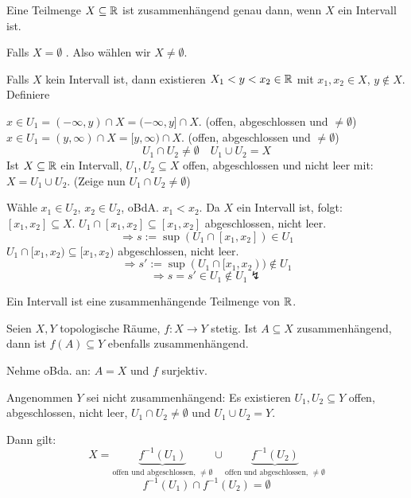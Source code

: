 \documentclass[main.tex]{subfiles}
\begin{document}
\begin{Theorem}
  Eine Teilmenge $X \subseteq \mathbb{R}$ ist zusammenhängend genau dann, wenn $X$ ein Intervall ist.
\end{Theorem}

\begin{Beweis}
  Falls $X = \emptyset$ \checkmark. Also wählen wir $X \neq \emptyset$.

  Falls $X$ kein Intervall ist, dann existieren $X_1 < y < x_2 \in \mathbb{R}$ mit $x_1,x_2 \in X$, $y \notin X$. Definiere

  $x \in U_1 = (-\infty, y) \cap X = (-\infty,y] \cap X$. (offen, abgeschlossen und $\neq \emptyset$)
  $x \in U_1 = (y,\infty) \cap X = [y,\infty) \cap X$. (offen, abgeschlossen und $\neq \emptyset$)
  $$U_1 \cap U_2 \neq \emptyset \quad U_1 \cup U_2 = X$$
  Ist $X \subseteq \mathbb{R}$ ein Intervall, $U_1 , U_2 \subseteq X$ offen, abgeschlossen und nicht leer mit: $X = U_1 \cup U_2$. (Zeige nun $U_1 \cap U_2 \neq \emptyset$)

  Wähle $x_1 \in U_2$, $x_2 \in U_2$, oBdA. $x_1 < x_2$. Da $X$ ein Intervall ist, folgt: $[x_1,x_2] \subseteq X$. $U_1 \cap [x_1,x_2] \subseteq [x_1,x_2]$ abgeschlossen, nicht leer.
  $$\Rightarrow s := \sup(U_1 \cap [x_1,x_2]) \in U_1$$
  $U_1 \cap [x_1,x_2) \subseteq [x_1,x_2)$ abgeschlossen, nicht leer.
  $$\Rightarrow s' := \sup(U_1 \cap [x_1,x_2)) \notin U_1$$
  $$\Rightarrow s = s' \in U_1 \notin U_1 \lightning$$
\end{Beweis}

\begin{Bemerkung}
  Ein Intervall ist eine zusammenhängende Teilmenge von $\mathbb{R}$.
\end{Bemerkung}

\begin{Theorem}
  Seien $X,Y$ topologische Räume, $f: X \to Y$ stetig. Ist $A \subseteq X$ zusammenhängend, dann ist $f(A) \subseteq Y$ ebenfalls zusammenhängend.
\end{Theorem}

\begin{Beweis}
  Nehme oBda. an: $A = X$ und $f$ surjektiv.

  Angenommen $Y$ sei nicht zusammenhängend: Es existieren $U_1, U_2 \subseteq Y$ offen, abgeschlossen, nicht leer, $U_1 \cap U_2 \neq \emptyset$ und $U_1 \cup U_2 = Y$.

  Dann gilt:
  $$X = \underbrace{f^{-1}(U_1)}_{\text{offen und abgeschlossen, } \neq \emptyset} \cup \underbrace{f^{-1}(U_2)}_{\text{offen und abgeschlossen, } \neq \emptyset}$$
  $$f^{-1}(U_1) \cap f^{-1}(U_2) = \emptyset$$
\end{Beweis}
\end{document}
